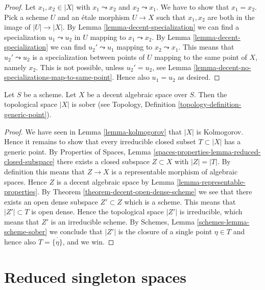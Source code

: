 \begin{proof}
Let $x_1, x_2 \in |X|$ with $x_1 \leadsto x_2$ and $x_2 \leadsto x_1$.
We have to show that $x_1 = x_2$. Pick a scheme $U$ and an \'etale morphism
$U \to X$ such that $x_1, x_2$ are both in the image of $|U| \to |X|$.
By Lemma \ref{lemma-decent-specialization} we can find a specialization
$u_1 \leadsto u_2$ in $U$ mapping to $x_1 \leadsto x_2$.
By Lemma \ref{lemma-decent-specialization} we can find
$u_2' \leadsto u_1$ mapping to $x_2 \leadsto x_1$. This means that
$u_2' \leadsto u_2$ is a specialization between points of $U$ mapping to
the same point of $X$, namely $x_2$. This is not possible, unless
$u_2' = u_2$, see
Lemma \ref{lemma-decent-no-specializations-map-to-same-point}. Hence
also $u_1 = u_2$ as desired.
\end{proof}

\begin{proposition}
\label{proposition-reasonable-sober}
Let $S$ be a scheme. Let $X$ be a decent algebraic space over $S$.
Then the topological space $|X|$ is sober (see
Topology, Definition \ref{topology-definition-generic-point}).
\end{proposition}

\begin{proof}
We have seen in Lemma \ref{lemma-kolmogorov} that $|X|$ is Kolmogorov.
Hence it remains to show that every irreducible closed subset
$T \subset |X|$ has a generic point. By
Properties of Spaces,
Lemma \ref{spaces-properties-lemma-reduced-closed-subspace}
there exists a closed subspace $Z \subset X$ with $|Z| = |T|$.
By definition this means that $Z \to X$ is a representable morphism
of algebraic spaces. Hence $Z$ is a decent algebraic space
by Lemma \ref{lemma-representable-properties}. By
Theorem \ref{theorem-decent-open-dense-scheme}
we see that there exists an open dense subspace $Z' \subset Z$
which is a scheme. This means that $|Z'| \subset T$ is open dense.
Hence the topological space $|Z'|$ is irreducible, which means that
$Z'$ is an irreducible scheme. By
Schemes, Lemma \ref{schemes-lemma-scheme-sober}
we conclude that $|Z'|$ is the closure of a single point $\eta \in T$
and hence also $T = \overline{\{\eta\}}$, and we win.
\end{proof}





\section{Reduced singleton spaces}
\label{section-singleton}

